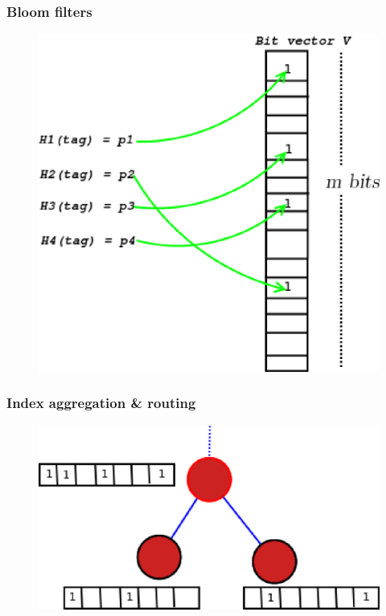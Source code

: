 \documentclass{beamer}
\begin{document}

\begin{frame}[fragile] %
\frametitle{Bloom filters}
\begin{figure}
\includegraphics[scale=0.4]{bloom}
\end{figure}
\end{frame}

\begin{frame}[fragile] %
\frametitle{Index aggregation \& routing}
\begin{figure}
\includegraphics[scale=0.4]{d3}
\end{figure}
\end{frame}
\end{document}

